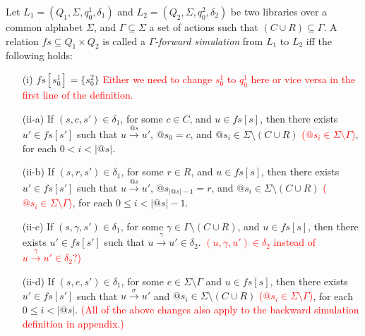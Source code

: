 \begin{dfn}
Let $L_1=(Q_1,\Sigma, q_0^1, \delta_1)$ and $L_2=(Q_2,\Sigma, q_0^2, \delta_2)$ be two libraries over a common alphabet $\Sigma$, and $\Gamma\subseteq \Sigma$ a set of actions such that $(C\cup R)\subseteq \Gamma$. A relation $\mathit{fs} \subseteq Q_{1} \times Q_{2}$ is called a \emph{$\Gamma$-forward simulation} from $L_1$ to $L_2$ iff the following holds:
\begin{itemize}
\item[(i)] $\mathit{fs}[s_0^1] = \{s_0^2 \}$ \textcolor{red}{Either we need to change $s_0^1$ to $q_0^1$ here or vice versa in the first line of the definition.}
\item[(ii-a)] If $(s,c,s') \in \delta_1$, for some $c\in C$, and $u \in \mathit{fs}[s]$, then there exists $u' \in \mathit{fs}[s']$ such that $u \xrightarrow{@s} u'$, $@s_0=c$, and $@s_i\in \Sigma\setminus(C\cup R)$ \textcolor{red}{($@s_i\in \Sigma\setminus \Gamma$)}, for each $0<i<|@s|$.
\item[(ii-b)] If $(s,r,s') \in \delta_{1}$, for some $r\in R$, and $u \in \mathit{fs}[s]$, then there exists $u' \in \mathit{fs}[s']$ such that $u \xrightarrow{@s} u'$, $@s_{|@s| -1}=r$, and $@s_i\in \Sigma\setminus(C\cup R)$  \textcolor{red}{($@s_i\in \Sigma\setminus \Gamma$)}, for each $0\leq i<|@s| -1$.
\item[(ii-c)] If $(s, \gamma , s') \in \delta_1$, for some $\gamma\in \Gamma\setminus (C\cup R)$, and $u \in fs[s]$, then there exists $u' \in fs[s']$ such that $u\xrightarrow{\gamma} u'  \in \delta_2$. \textcolor{red}{$(u,\gamma, u') \in \delta_2$ instead of $u\xrightarrow{\gamma} u'  \in \delta_2$?)}
\item[(ii-d)] If $(s,e,s') \in \delta_1$, for some $e \in \Sigma\setminus \Gamma$ and $u \in \mathit{fs}[s]$, then there exists $u' \in \mathit{fs}[s']$ such that $u \xrightarrow{\sigma} u'$ and $@s_i\in \Sigma\setminus(C\cup R)$  \textcolor{red}{($@s_i\in \Sigma\setminus \Gamma$)}, for each $0\leq i<|@s|$.  \textcolor{red}{(All of the above changes also apply to the backward simulation definition in appendix.)}
\end{itemize}
\end{dfn}
